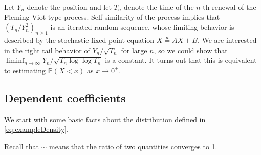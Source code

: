 \documentclass[bj]{imsart}
\numberwithin{equation}{section}
\renewcommand{\P}{\mathbb{P}}
\newcommand{\1}{\mathbf{1}}
\theoremstyle{definition}
\begin{document}
Let $Y_n$ denote the position and let $T_n$ denote the time of the $n$-th renewal of the Fleming-Viot type process. 
Self-similarity of the process implies that $\left(T_n/Y_n^2\right)_{n\geq 1}$ is an iterated random sequence,
whose limiting behavior is described by the stochastic fixed point equation $X\stackrel{d}{=}AX+B$.  
We are interested in the right tail behavior of $Y_n/\sqrt{T_n}$ for large $n$, so we could show that 
$\liminf_{n\to \infty} Y_n/\sqrt{T_n \log \log T_n}$ is a constant. It turns out that this is equivalent to estimating $\P(X<x)$ 
as $x\to 0^+$.

\subsection{Dependent coefficients}
We start with some basic facts about the distribution defined in \eqref{eq:exampleDensity}.

Recall that $\sim$ means that the ratio of  two quantities converges to 1.
\end{document}
